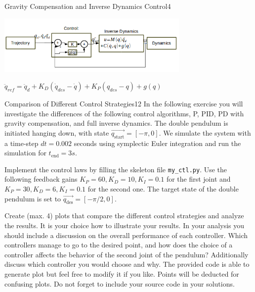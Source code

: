 \begin{questions}
\begin{question}{Gravity Compensation and Inverse Dynamics Control}{4}
\begin{answer}
				\begin{center}
					\includegraphics[width=0.7\textwidth]{img/2b.png} 
				\end{center}
				
				$\ddot{{q}}_{ref}={\ddot{q}}_d+K_D(\dot{q}_{des}-\dot{q})+K_P(q_{des}-q)+g(q)$
	\end{answer}
		
	\end{question}
	
	
	\begin{question}{Comparison of Different Control Strategies}{12}
		In the following exercise you will investigate the differences of the following control algorithms, P, PID, PD with gravity compensation, and full inverse dynamics.
		The double pendulum is initiated hanging down, with state $\vec{q_\textrm{start}}={[-\pi,0]}$. We simulate the system with a time-step $dt=0.002$ seconds using symplectic Euler integration and run the simulation for $t_\textrm{end}=3s$. 
		
		Implement the control laws by filling the skeleton file \texttt{my\_ctl.py}. Use the following feedback gains $K_P=60, K_D=10, K_I=0.1$ for the first joint and $K_P=30, K_D=6, K_I=0.1$ for the second one.
		The target state of the double pendulum is set to $\vec{q_\textrm{des}}={[-\pi / 2,0]}$. 
		
		Create (max. 4) plots that compare the different control strategies and analyze the results. It is your choice how to illustrate your results. In your analysis you should include a discussion on the overall performance of each controller. Which controllers manage to go to the desired point, and how does the choice of a controller affects the behavior of the second joint of the pendulum? Additionally discuss which controller you would choose and why. The provided code is able to generate plot but feel free to modify it if you like. Points will be deducted for confusing plots. Do not forget to include your source code in your solutions.
		

\end{question}
\end{questions}
